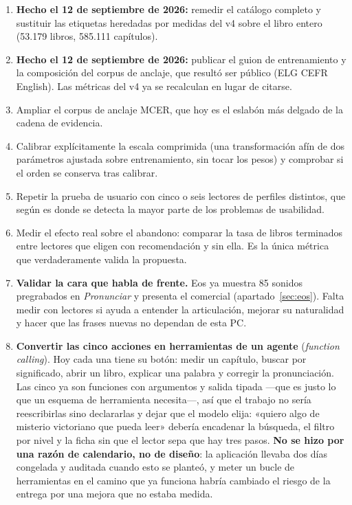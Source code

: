 \documentclass[11pt,a4paper]{article}
\begin{document}
\begin{enumerate}[leftmargin=*, itemsep=3pt]
  \item \textbf{Hecho el 12 de septiembre de 2026:} remedir el catálogo completo y sustituir
        las etiquetas heredadas por medidas del v4 sobre el libro entero (53.179 libros,
        585.111 capítulos).
  \item \textbf{Hecho el 12 de septiembre de 2026:} publicar el guion de entrenamiento y la
        composición del corpus de anclaje, que resultó ser público (ELG CEFR English). Las
        métricas del v4 ya se recalculan en lugar de citarse.
  \item Ampliar el corpus de anclaje MCER, que hoy es el eslabón más delgado de la cadena
        de evidencia.
  \item Calibrar explícitamente la escala comprimida (una transformación afín de dos
        parámetros ajustada sobre entrenamiento, sin tocar los pesos) y comprobar si el
        orden se conserva tras calibrar.
  \item Repetir la prueba de usuario con cinco o seis lectores de perfiles distintos, que
        según \textcite{nielsen2000five} es donde se detecta la mayor parte de los
        problemas de usabilidad.
  \item Medir el efecto real sobre el abandono: comparar la tasa de libros terminados
        entre lectores que eligen con recomendación y sin ella. Es la única métrica que
        verdaderamente valida la propuesta.
  \item \textbf{Validar la cara que habla de frente.} Eos ya muestra 85 sonidos
        pregrabados en \emph{Pronunciar} y presenta el comercial
        (apartado~\ref{sec:eos}). Falta medir con lectores si ayuda a entender la
        articulación, mejorar su naturalidad y hacer que las frases nuevas no
        dependan de esta PC.
  \item \textbf{Convertir las cinco acciones en herramientas de un agente}
        (\emph{function calling}). Hoy cada una tiene su botón: medir un capítulo,
        buscar por significado, abrir un libro, explicar una palabra y corregir la
        pronunciación. Las cinco ya son funciones con argumentos y salida tipada
        ---que es justo lo que un esquema de herramienta necesita---, así que el
        trabajo no sería reescribirlas sino declararlas y dejar que el modelo elija:
        «quiero algo de misterio victoriano que pueda leer» debería encadenar la
        búsqueda, el filtro por nivel y la ficha sin que el lector sepa que hay tres
        pasos. \textbf{No se hizo por una razón de calendario, no de diseño}: la
        aplicación llevaba dos días congelada y auditada cuando esto se planteó, y
        meter un bucle de herramientas en el camino que ya funciona habría cambiado
        el riesgo de la entrega por una mejora que no estaba medida.
\end{enumerate}
\end{document}
